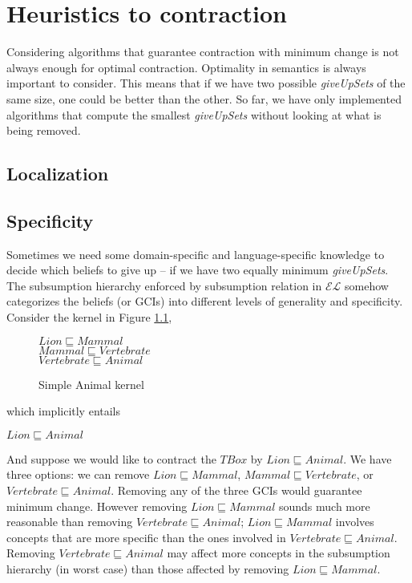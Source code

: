 \chapter{Heuristics to contraction}
Considering algorithms that guarantee contraction with minimum change is not always enough for optimal contraction. Optimality in semantics is always important to consider. This means that if we have two possible \textit{giveUpSets} of the same size, one could be better than the other. So far, we have only implemented algorithms that compute the smallest \textit{giveUpSets} without looking at what is being removed. 



\section{Localization}
\section{Specificity}

Sometimes we need some domain-specific and language-specific knowledge to decide which beliefs to give up -- if we have two equally minimum \textit{giveUpSets}. The subsumption hierarchy enforced by subsumption relation in $\mathcal{EL}$ somehow categorizes the beliefs (or GCIs) into different levels of generality and specificity. Consider the kernel in Figure \ref{fig:AnimalKernel},
\begin{figure}
\begin{center}
$Lion \sqsubseteq Mammal$\\
$Mammal \sqsubseteq Vertebrate$\\
$Vertebrate \sqsubseteq Animal$
\end{center}
\caption{Simple Animal kernel}
\label{fig:AnimalKernel}
\end{figure}
which implicitly entails
\begin{center}
$Lion \sqsubseteq Animal$
\end{center}
And suppose we would like to contract the $TBox$ by $Lion \sqsubseteq Animal$. We have three options: we can remove $Lion \sqsubseteq Mammal$, $Mammal \sqsubseteq Vertebrate$, or $Vertebrate \sqsubseteq Animal$. Removing any of the three GCIs would guarantee minimum change. However removing $Lion \sqsubseteq Mammal$ sounds much more reasonable than removing $Vertebrate \sqsubseteq Animal$; $Lion \sqsubseteq Mammal$ involves concepts that are more specific than the ones involved in $Vertebrate \sqsubseteq Animal$. Removing $Vertebrate \sqsubseteq Animal$ may affect more concepts in the subsumption hierarchy (in worst case) than those affected by removing $Lion \sqsubseteq Mammal$. 

